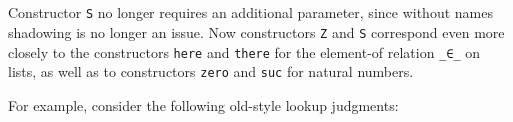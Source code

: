 \begin{fence}
\begin{code}%
\>[0]\AgdaSpace{}%
\AgdaSpace{}%
\AgdaSymbol{:}\AgdaSpace{}%
\AgdaSpace{}%
\AgdaSpace{}%
\AgdaSpace{}%
\AgdaSpace{}%
\AgdaSpace{}%
\<%
\\
%
\\[\AgdaEmptyExtraSkip]%
\>[0][@{}l@{\AgdaIndent{0}}]%
\>[2]%
\>[87I]\AgdaSymbol{:}%
\>[88I]\AgdaSpace{}%
\AgdaSymbol{\{}\AgdaSpace{}%
\AgdaSymbol{\}}\<%
\\
\>[.][@{}l@{}]\<[88I]%
\>[6]\AgdaComment{---------}\<%
\\
\>[.][@{}l@{}]\<[87I]%
\>[4]\AgdaSpace{}%
\AgdaSpace{}%
\AgdaOperator{\AgdaInductiveConstructor{,}}\AgdaSpace{}%
\AgdaSpace{}%
\AgdaSpace{}%
\<%
\\
%
\\[\AgdaEmptyExtraSkip]%
%
\>[2]\AgdaSpace{}%
\AgdaSymbol{:}\AgdaSpace{}%
\AgdaSpace{}%
\AgdaSymbol{\{}\AgdaSpace{}%
\AgdaSpace{}%
\AgdaSymbol{\}}\<%
\\
\>[2][@{}l@{\AgdaIndent{0}}]%
\>[4]%
\>[101I]\AgdaSpace{}%
\AgdaSpace{}%
\<%
\\
\>[.][@{}l@{}]\<[101I]%
\>[6]\AgdaComment{---------}\<%
\\
%
\>[4]\AgdaSpace{}%
\AgdaSpace{}%
\AgdaOperator{\AgdaInductiveConstructor{,}}\AgdaSpace{}%
\AgdaSpace{}%
\AgdaSpace{}%
\<%
\end{code}
\end{fence}

Constructor \texttt{S} no longer requires an additional parameter, since
without names shadowing is no longer an issue. Now constructors
\texttt{Z} and \texttt{S} correspond even more closely to the
constructors \texttt{here} and \texttt{there} for the element-of
relation \texttt{\_∈\_} on lists, as well as to constructors
\texttt{zero} and \texttt{suc} for natural numbers.

For example, consider the following old-style lookup judgments:

